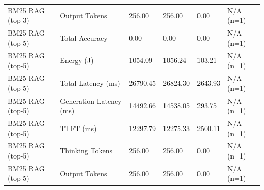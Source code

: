 \begin{table}
\begin{tabular}{llllll}
BM25 RAG (top-3) & Output Tokens & 256.00 & 256.00 & 0.00 & N/A (n=1) \\
BM25 RAG (top-5) & Total Accuracy & 0.00 & 0.00 & 0.00 & N/A (n=1) \\
BM25 RAG (top-5) & Energy (J) & 1054.09 & 1056.24 & 103.21 & N/A (n=1) \\
BM25 RAG (top-5) & Total Latency (ms) & 26790.45 & 26824.30 & 2643.93 & N/A (n=1) \\
BM25 RAG (top-5) & Generation Latency (ms) & 14492.66 & 14538.05 & 293.75 & N/A (n=1) \\
BM25 RAG (top-5) & TTFT (ms) & 12297.79 & 12275.33 & 2500.11 & N/A (n=1) \\
BM25 RAG (top-5) & Thinking Tokens & 256.00 & 256.00 & 0.00 & N/A (n=1) \\
BM25 RAG (top-5) & Output Tokens & 256.00 & 256.00 & 0.00 & N/A (n=1) \\
\bottomrule
\end{tabular}
\end{table}
